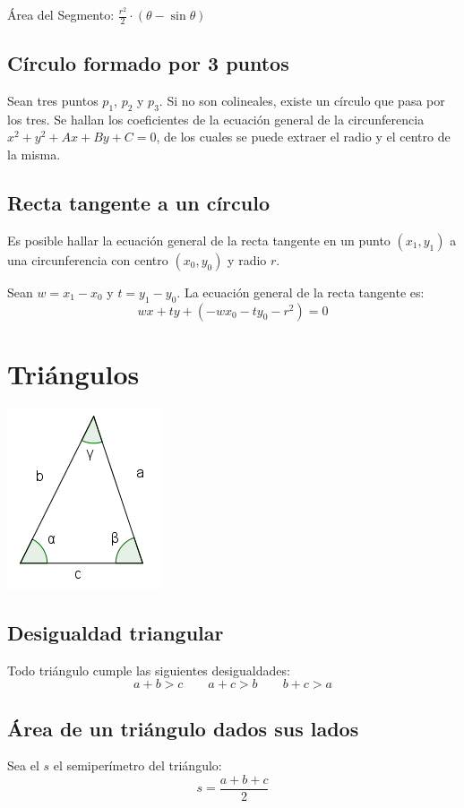\documentclass{article}
\begin{document}
\begin{multicols}{2}
Área del Segmento: \( \frac{r^2}{2} \cdot ( \theta - \sin \theta ) \)

\subsection{Círculo formado por 3 puntos}
Sean tres puntos  \( p_1 \), \( p_2 \) y  \( p_3 \). Si no son colineales, existe un círculo que pasa por los tres. Se hallan los coeficientes de la ecuación general de la circunferencia \( x^2+y^2+Ax+By+C=0 \), de los cuales se puede extraer el radio y el centro de la misma.


\subsection{Recta tangente a un círculo}
Es posible hallar la ecuación general de la recta tangente en un punto \( (x_1, y_1) \) a una circunferencia con centro \( (x_0, y_0) \) y radio \( r \). 

Sean \( w = x_1-x_0 \) y \( t = y_1-y_0 \). La ecuación general de la recta tangente es:
\[ wx + ty + (-wx_0 - ty_0 - r^2) = 0 \]

\section{Triángulos}

\includegraphics{triangulo}

\subsection{Desigualdad triangular}
Todo triángulo cumple las siguientes desigualdades:
\[ a+b > c \qquad a+c > b \qquad b+c>a \]

\subsection{Área de un triángulo dados sus lados}
Sea el \( s \) el semiperímetro del triángulo:
\[ s = \frac{a+b+c}{2} \]


\end{multicols}
\end{document}
